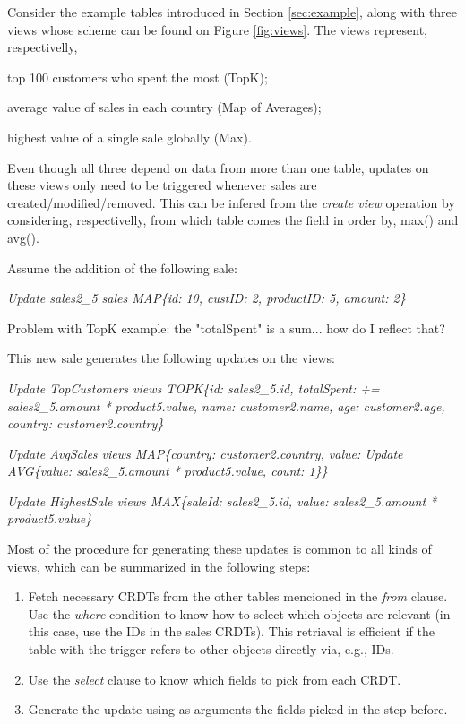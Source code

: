 \documentclass{vldb}
\newcommand{\grumbler}[2]{{\color{red}{\bf #1:} #2}}
\newcommand{\andre}[1]{\grumbler{andre}{#1}}
\newcommand{\emphvspace}{0.5\baselineskip}
\newcommand{\lineemph}[1]{\vspace{\emphvspace}\hspace{2em}\emph{#1}\vspace{\emphvspace}}
\newcommand{\firstblockemph}[1]{\vspace{\emphvspace}\hspace{2em}\emph{#1}}
\newcommand{\middleblockemph}[1]{\hspace{2em}\emph{#1}}
\newcommand{\lastblockemph}[1]{\hspace{2em}\emph{#1}\vspace{\emphvspace}}
\begin{document}
Consider the example tables introduced in Section \ref{sec:example}, along with three views whose scheme can be found on Figure \ref{fig:views}.
The views represent, respectivelly, 
\begin{enumerate*}[label=(\roman*)]
	\item \label{item:topk} top 100 customers who spent the most (TopK);
	\item \label{item:avg} average value of sales in each country (Map of Averages);
	\item \label{item:max} highest value of a single sale globally (Max).
\end{enumerate*}
Even though all three depend on data from more than one table, updates on these views only need to be triggered whenever sales are created/modified/removed.
This can be infered from the \emph{create view} operation by considering, respectivelly, from which table comes the field in order by, max() and avg().

Assume the addition of the following sale:

\lineemph{Update sales2\_5 sales MAP\{id: 10, custID: 2, productID: 5, amount: 2\}}

\andre{Problem with TopK example: the "totalSpent" is a sum... how do I reflect that?}

This new sale generates the following updates on the views:

\firstblockemph{Update TopCustomers views TOPK\{id: sales2\_5.id, totalSpent: += sales2\_5.amount * product5.value, name: customer2.name, age: customer2.age, country: customer2.country\}}

\middleblockemph{Update AvgSales views MAP\{country: customer2.country, value: Update AVG\{value: sales2\_5.amount * product5.value, count: 1\}\}}

\lastblockemph{Update HighestSale views MAX\{saleId: sales2\_5.id, value: sales2\_5.amount * product5.value\}}

Most of the procedure for generating these updates is common to all kinds of views, which can be summarized in the following steps:

\begin{enumerate}
	\item Fetch necessary CRDTs from the other tables mencioned in the \emph{from} clause. 
	Use the \emph{where} condition to know how to select which objects are relevant (in this case, use the IDs in the sales CRDTs).
	This retriaval is efficient if the table with the trigger refers to other objects directly via, e.g., IDs.
	\item Use the \emph{select} clause to know which fields to pick from each CRDT.
	\item Generate the update using as arguments the fields picked in the step before.
\end{enumerate}
\end{document}
